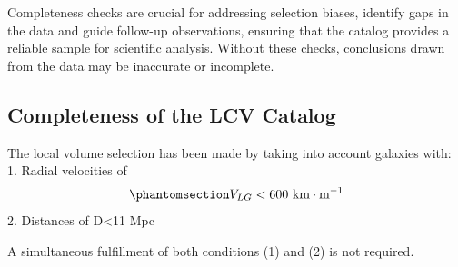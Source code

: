 \documentclass[
]{article}
\begin{document}
Completeness checks are crucial for addressing selection biases,
identify gaps in the data and guide follow-up observations, ensuring
that the catalog provides a reliable sample for scientific analysis.
Without these checks, conclusions drawn from the data may be inaccurate
or incomplete.

\subsection{Completeness of the LCV
Catalog}\label{completeness-of-the-lcv-catalog}

The local volume selection has been made by taking into account galaxies
with: 1. Radial velocities of
\begin{equation}\phantomsection\label{eq-lcv-vel}{
    V_{LG}<600 \text{ km}\cdot\text{m}^{-1}
    }\end{equation} 2. Distances of D\textless11 Mpc

A simultaneous fulfillment of both conditions (1) and (2) is not
required.
\end{document}
